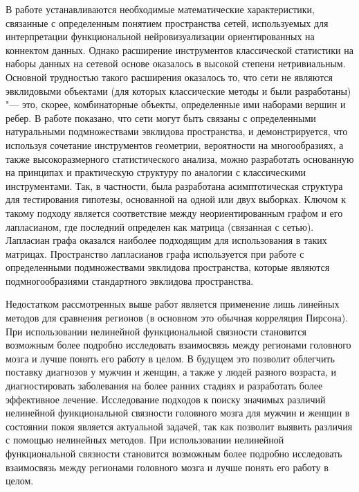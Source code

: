 В работе \cite{ginestet2017hypothesis} устанавливаются необходимые математические характеристики, связанные 
с определенным понятием пространства сетей, используемых для интерпретации функциональной нейровизуализации 
ориентированных на коннектом данных. Однако расширение инструментов классической статистики на наборы данных 
на сетевой основе оказалось в высокой степени нетривиальным. Основной трудностью такого расширения оказалось 
то, что сети не являются эвклидовыми объектами (для которых классические методы и были разработаны) "--- это, 
скорее, комбинаторные объекты, определенные ими наборами вершин и ребер. В работе \cite{ginestet2017hypothesis} 
показано, что сети могут быть связаны с определенными натуральными подмножествами эвклидова пространства, 
и демонстрируется, что используя сочетание инструментов геометрии, вероятности на многообразиях, а также 
высокоразмерного статистического анализа, можно разработать основанную на принципах и практическую структуру по 
аналогии с классическими инструментами. Так, в частности, была разработана асимптотическая структура для тестирования 
гипотезы, основанной на одной или двух выборках. Ключом к такому подходу является соответствие между 
неориентированным графом и его лапласианом, где последний определен как матрица (связанная с сетью). 
Лапласиан графа оказался наиболее подходящим для использования в таких матрицах. Пространство лапласианов 
графа используется при работе с определенными подмножествами эвклидова пространства, которые являются 
подмногообразиями стандартного эвклидова пространства.


Недостатком рассмотренных выше работ является применение лишь линейных методов для сравнения регионов 
(в основном это обычная корреляция Пирсона). При использовании нелинейной функциональной связности становится 
возможным более подробно исследовать взаимосвязь между регионами головного мозга и лучше понять его работу в целом. 
В будущем это позволит облегчить поставку диагнозов у мужчин и женщин, а также у людей разного возраста, 
и диагностировать заболевания на более ранних стадиях и разработать более эффективное лечение. Исследование 
подходов к поиску значимых различий нелинейной функциональной связности головного мозга для мужчин и женщин 
в состоянии покоя является актуальной задачей, так как позволит выявить различия с помощью нелинейных методов. 
При использовании нелинейной функциональной связности становится возможным более подробно исследовать 
взаимосвязь между регионами головного мозга и лучше понять его работу в целом.

